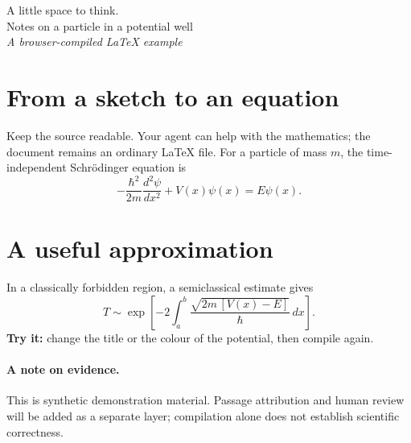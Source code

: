 \documentclass[11pt]{article}
\begin{document}
\begin{center}
{\Huge A little space to think.}\\[8pt]
{\large Notes on a particle in a potential well}\\[4pt]
\textit{A browser-compiled LaTeX example}
\end{center}
\section{From a sketch to an equation}
Keep the source readable. Your agent can help with the mathematics; the document remains an ordinary \LaTeX{} file.
For a particle of mass $m$, the time-independent Schr\"odinger equation is
\begin{equation}
-\frac{\hbar^2}{2m}\frac{d^2\psi}{dx^2}+V(x)\psi(x)=E\psi(x).
\end{equation}
\begin{center}
\end{center}
\section{A useful approximation}
In a classically forbidden region, a semiclassical estimate gives
\[
T\sim\exp\!\left[-2\int_a^b\frac{\sqrt{2m\,[V(x)-E]}}{\hbar}\,dx\right].
\]
\textbf{Try it:} change the title or the colour of the potential, then compile again.
\paragraph{A note on evidence.} This is synthetic demonstration material. Passage attribution and human review will be added as a separate layer; compilation alone does not establish scientific correctness.
\end{document}
